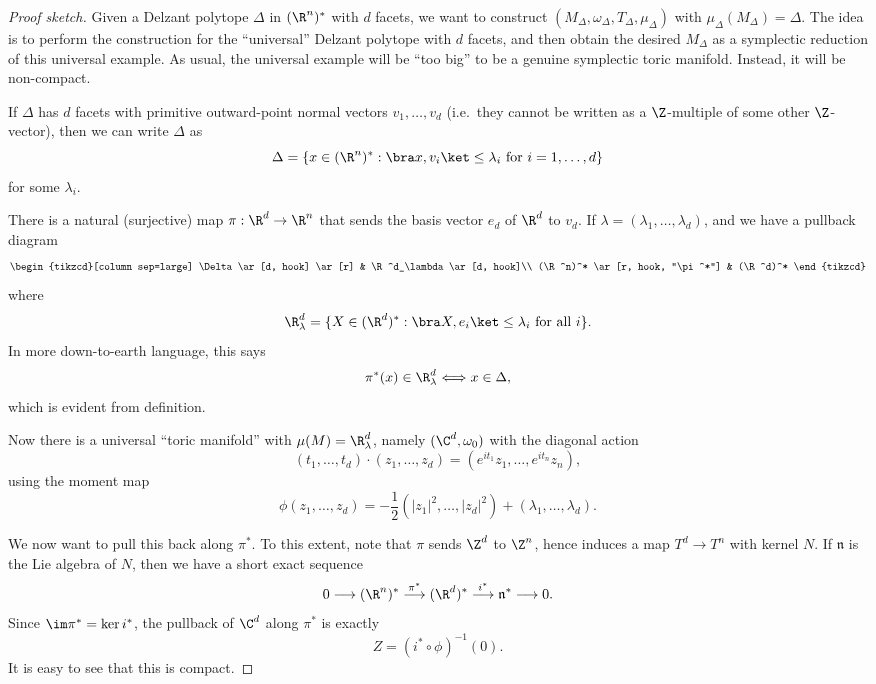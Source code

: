\documentclass[a4paper]{article}
\begin{document}
\begin{proof}[Proof sketch]
  Given a Delzant polytope $\Delta$ in $(\R^n)^*$ with $d$ facets, we want to construct $(M_\Delta, \omega_\Delta, T_\Delta, \mu_\Delta)$ with $\mu_\Delta(M_\Delta) = \Delta$. The idea is to perform the construction for the ``universal'' Delzant polytope with $d$ facets, and then obtain the desired $M_\Delta$ as a symplectic reduction of this universal example. As usual, the universal example will be ``too big'' to be a genuine symplectic toric manifold. Instead, it will be non-compact.

  If $\Delta$ has $d$ facets with primitive outward-point normal vectors $v_1, \ldots, v_d$ (i.e.\ they cannot be written as a $\Z$-multiple of some other $\Z$-vector), then we can write $\Delta$ as
  \[
    \Delta = \{x \in (\R^n)^* : \bra x, v_i \ket \leq \lambda_i\text{ for }i = 1, \ldots, d\}
  \]
  for some $\lambda_i$.

  There is a natural (surjective) map $\pi: \R^d \to \R^n$ that sends the basis vector $e_d$ of $\R^d$ to $v_d$. If $\lambda = (\lambda_1, \ldots, \lambda_d)$, and we have a pullback diagram
   \[
    \begin{tikzcd}[column sep=large]
      \Delta \ar[d, hook] \ar[r] & \R^d_\lambda \ar[d, hook]\\
      (\R^n)^* \ar[r, hook, "\pi^*"] & (\R^d)^*
    \end{tikzcd}
  \]
  where
  \[
    \R^d_\lambda = \{X \in (\R^d)^* : \bra X, e_i\ket \leq \lambda_i\text{ for all }i\}.
  \]
  In more down-to-earth language, this says
  \[
    \pi^*(x) \in \R^d_\lambda \Longleftrightarrow x \in \Delta,
  \]
  which is evident from definition.

  Now there is a universal ``toric manifold'' with $\mu(M) = \R^d_\lambda$, namely $(\C^d, \omega_0)$ with the diagonal action
  \[
    (t_1, \ldots, t_d) \cdot (z_1, \ldots, z_d) = (e^{it_1} z_1, \ldots, e^{it_n}z_n),
  \]
  using the moment map
  \[
    \phi(z_1, \ldots, z_d) = -\frac{1}{2}(|z_1|^2, \ldots, |z_d|^2) + (\lambda_1, \ldots,\lambda_d).
  \]

  We now want to pull this back along $\pi^*$. To this extent, note that $\pi$ sends $\Z^d$ to $\Z^n$, hence induces a map $T^d \to T^n$ with kernel $N$. If $\mathfrak{n}$ is the Lie algebra of $N$, then we have a short exact sequence
  \[
    0 \longrightarrow (\R^n)^* \overset{\pi^*}{\longrightarrow} (\R^d)^* \overset{i^*}{\longrightarrow} \mathfrak{n}^* \longrightarrow 0.
  \]
  Since $\im \pi^* = \ker i^*$, the pullback of $\C^d$ along $\pi^*$ is exactly
  \[
    Z = (i^* \circ \phi)^{-1}(0).
  \]
  It is easy to see that this is compact.


\end{proof}
\end{document}
